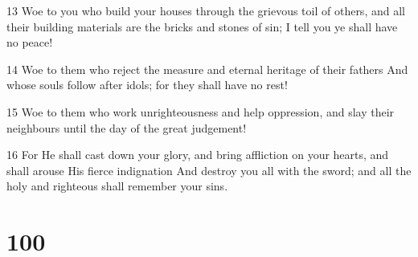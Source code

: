 \par 13 Woe to you who build your houses through the grievous toil of others, and all their building materials are the bricks and stones of sin; I tell you ye shall have no peace!
\par 14 Woe to them who reject the measure and eternal heritage of their fathers And whose souls follow after idols; for they shall have no rest!
\par 15 Woe to them who work unrighteousness and help oppression, and slay their neighbours until the day of the great judgement!
\par 16 For He shall cast down your glory, and bring affliction on your hearts, and shall arouse His fierce indignation And destroy you all with the sword; and all the holy and righteous shall remember your sins.

\chapter{100}

